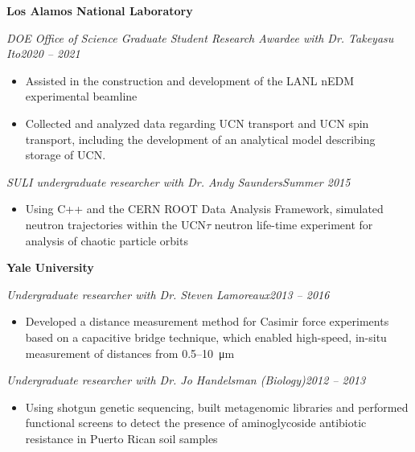 \begin{singlespace}
{\vspace{\baselineskip}
\textbf{Los Alamos National Laboratory}

\textit{DOE Office of Science Graduate Student Research Awardee with Dr. Takeyasu Ito}\hfill\textit{2020 -- 2021}
\begin{itemize}[noitemsep,topsep=0pt]
    \item Assisted in the construction and development of the LANL nEDM experimental beamline
    \item Collected and analyzed data regarding UCN transport and UCN spin transport, including the development of an analytical model describing storage of UCN.
\end{itemize}

\vspace{0.5\baselineskip}

\textit{SULI undergraduate researcher with Dr. Andy Saunders}\hfill\textit{Summer 2015}
\begin{itemize}[noitemsep,topsep=0pt]
    \item Using C++ and the CERN ROOT Data Analysis Framework, simulated neutron trajectories within the UCN$\tau$ neutron life-time experiment for analysis of chaotic particle orbits 
\end{itemize}

\vspace{\baselineskip}
\textbf{Yale University}

\textit{Undergraduate researcher with Dr. Steven Lamoreaux}\hfill\textit{2013 -- 2016}
\begin{itemize}[noitemsep,topsep=0pt]
    \item Developed a distance measurement method for Casimir force experiments based on a capacitive bridge technique, which enabled high-speed, in-situ measurement of distances from 0.5--\qty{10}{\micro m} 
\end{itemize}

\vspace{0.5\baselineskip}

\textit{Undergraduate researcher with Dr. Jo Handelsman (Biology)}\hfill\textit{2012 -- 2013}
\begin{itemize}[noitemsep,topsep=0pt]
    \item Using shotgun genetic sequencing, built metagenomic libraries and performed functional screens to detect the presence of aminoglycoside antibiotic resistance in Puerto Rican soil samples
\end{itemize}


}
\end{singlespace}
